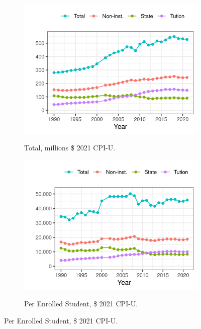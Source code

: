 \documentclass[notitlepage,12pt]{article}
\begin{document}
\begin{figure}[h!]
    \centering
    \caption{Mean Total Revenues among Public Universities, by Year.}
    \begin{subfigure}[b]{0.495\textwidth}
        \centering
        \caption{Total, millions \$ 2021 CPI-U.}
        \includegraphics[width=\textwidth]{figures/mean-funding-total.png}
        \label{fig:mean-funding-total}
    \end{subfigure}
    \begin{subfigure}[b]{0.495\textwidth}
        \centering
        \caption{Per Enrolled Student, \$ 2021 CPI-U.}
        \includegraphics[width=\textwidth]{figures/mean-funding-fte.png}
        \label{fig:mean-funding-fte}
    \end{subfigure}
    \label{fig:funding}
\end{figure}
\end{document}
